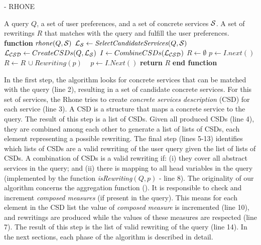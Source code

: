\begin{algorithm}
\small
\caption{ - RHONE}
\label{algo-rhone}
\begin{algorithmic}[1]
\REQUIRE A query $Q$, a set of user preferences, and a set of concrete services $\hbox{${\cal S}$}$.
\ENSURE A set of rewritings $R$ that matches with the query and fulfill the user preferences.
\STATE \textbf{function} $\mathit{rhone} (Q, \hbox{${\cal S}$})$
 \STATE  $\hbox{${\cal L_{S}}$} \leftarrow \mathit{SelectCandidateServices}(Q, \hbox{${\cal S}$})$ \label{rhone:buildPCD}
 \STATE  $\hbox{${\cal L_{CSD}}$} \leftarrow CreateCSDs(Q, \hbox{${\cal L_{S}}$})$
 \STATE  $I \leftarrow CombineCSDs(\hbox{${\cal L_{CSD}}$})$
 \STATE $R\leftarrow \emptyset$
    \STATE $p \leftarrow I.next()$
  \STATE $R\leftarrow R\,\cup \mathit{Rewriting}(p)$
  \STATE ~\!
   \ENDIF
      \STATE $p \leftarrow I.\mathit{Next}()$
 \ENDWHILE
    \STATE \textbf{return} $R$
\STATE \textbf{end function}
\end{algorithmic}
\end{algorithm}

In the first step, the algorithm looks for concrete services that 
can be matched with the query (line 2), resulting in a set of candidate concrete
services. For this set of services, the Rhone tries to create 
\textit{concrete services description} (CSD) for each service (line 3). 
A CSD is a structure that maps a concrete service to the query. 
The  result of this step is a list of CSDs.
Given all produced CSDs  (line 4), they are combined among each other to generate a list of lists of CSDs, each element representing a possible rewriting.
The final step (lines 5-13) identifies which lists of CSDs are a valid
rewriting of the user query given the list of lists of CSDs.
A combination of CSDs is a valid rewriting if: (i) they cover all abstract services in the query; and 
(ii) there is mapping to all head variables in the query (implemented by the function \textit{isRewriting}$(Q, p)$ - line 8).
The originality of our algorithm concerns the aggregation function ().
It is responsible to check and increment \textit{composed measures} (if present in the query). 
This means for each element in the CSD list the value of \textit{composed measure} is incremented (line 10), and rewritings are produced while the values of these measures are respected (line 7). 
The result of this step is the list of valid rewriting of the query (line 14). 
In the next sections, each phase of the algorithm is described in detail. 

